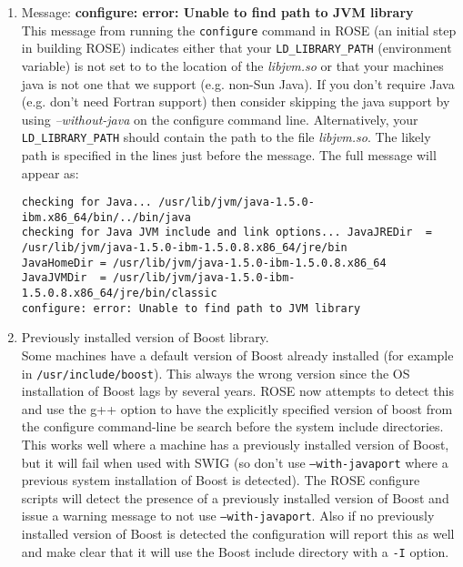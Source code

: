 \begin{enumerate}
    \item Message: {\bf configure: error: Unable to find path to JVM library} \\
   This message from running the {\tt configure} command in ROSE (an initial step in building
   ROSE) indicates either that your {\tt LD\_LIBRARY\_PATH} (environment variable) is not set to 
   to the location of the {\em libjvm.so} or that your machines java is not one that we
   support (e.g. non-Sun Java).  If you don't require Java (e.g. don't need Fortran
   support) then consider skipping the java support by using {\em --without-java} on the
   configure command line.
   Alternatively, your {\tt LD\_LIBRARY\_PATH} should contain the path to the file 
   {\em libjvm.so}.  The likely path is specified in the lines just before the message.  
   The full message will appear as:
\begin{verbatim}
checking for Java... /usr/lib/jvm/java-1.5.0-ibm.x86_64/bin/../bin/java
checking for Java JVM include and link options... JavaJREDir  = /usr/lib/jvm/java-1.5.0-ibm-1.5.0.8.x86_64/jre/bin
JavaHomeDir = /usr/lib/jvm/java-1.5.0-ibm-1.5.0.8.x86_64
JavaJVMDir  = /usr/lib/jvm/java-1.5.0-ibm-1.5.0.8.x86_64/jre/bin/classic
configure: error: Unable to find path to JVM library
\end{verbatim}

   \item Previously installed version of Boost library. \\
    Some machines have a default version of Boost already installed (for example in 
{\tt /usr/include/boost}).  This always the wrong version since the OS installation
of Boost lags by several years.  ROSE now attempts to detect this and use the 
{} g++ option to have the explicitly specified version of boost from
the configure command-line be search before the system include directories.  This works
well where a machine has a previously installed version of Boost, but it will fail when
used with SWIG (so don't use {\tt --with-javaport} where a previous system installation
of Boost is detected).  The ROSE configure scripts will detect the presence of a
previously installed version of Boost and issue a warning message to not use 
{\tt --with-javaport}.  Also if no previously installed version of Boost is detected
the configuration will report this as well and make clear that it will use the Boost
include directory with a {\tt -I} option.


\end{enumerate}
